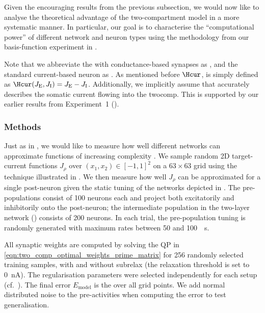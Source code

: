 Given the encouraging results from the previous subsection, we would now like to analyse the theoretical advantage of the two-compartment \LIF model in a more systematic manner.
In particular, our goal is to characterise the \enquote{computational power} of different network and neuron types using the methodology from our basis-function experiment in .

Note that we abbreviate the  with conductance-based synapses as \Hcond, and the standard current-based \LIF neuron as \Hcur.
As mentioned before $\Hcur$, is simply defined as $\Hcur(J_\mathrm{E}, J_\mathrm{I}) = J_\mathrm{E} - J_\mathrm{I}$.
Additionally, we implicitly assume that \Hcond accurately describes the somatic current flowing into the \gls{twocomp}.
This is supported by our earlier results from Experiment~1 ().

\subsubsection{Methods}
Just as in , we would like to measure how well different networks can approximate functions of increasing complexity \slc.
We sample random 2D target-current functions $J_\rho$ over $(x_1, x_2) \in [-1, 1]^2$ on a $63 \times 63$ grid using the technique illustrated in .
We then measure how well $J_\rho$ can be approximated for a single post-neuron given the static tuning of the networks depicted in .
The pre-populations consist of \num{100} neurons each and project both excitatorily and inhibitorily onto the post-neuron; the intermediate population in the two-layer network () consists of \num{200} neurons.
In each trial, the pre-population tuning is randomly generated with maximum rates between \num{50} and \SI{100}{\per\second}.

All synaptic weights are computed by solving the QP in \cref{eqn:two_comp_optimal_weights_prime_matrix} for 256 randomly selected training samples, with and without \gls{subrelax} (the relaxation threshold is set to \SI{0}{\nano\ampere}).
The regularisation parameters were selected independently for each setup (cf.~).
The final error $E_\mathrm{model}$ is the \NRMSE over all grid points.
We add normal distributed noise to the pre-activities when computing the error to test generalisation.

